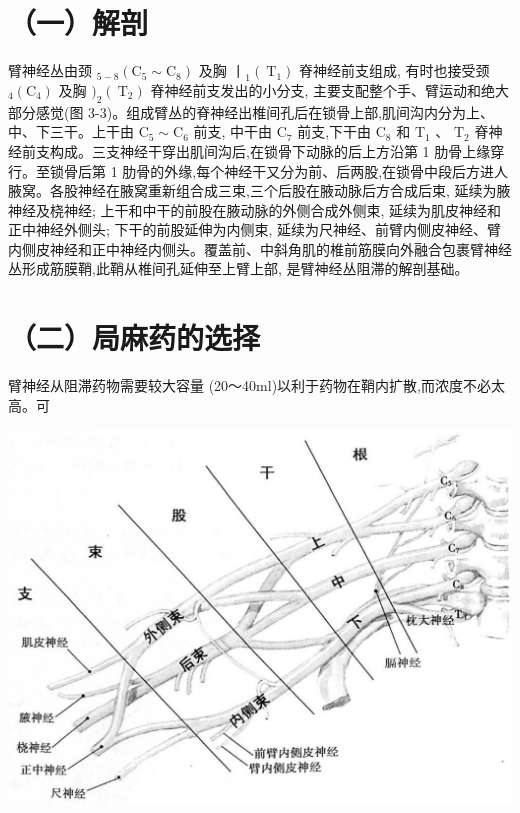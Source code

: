 \documentclass[10pt]{article}
\begin{document}
\section*{（一）解剖}
臂神经丛由颈 ${ }_{5-8}\left(\mathrm{C}_{5} \sim \mathrm{C}_{8}\right)$ 及胸 $丨_{1}\left(\mathrm{~T}_{1}\right)$ 脊神经前支组成, 有时也接受颈 ${ }_{4}\left(\mathrm{C}_{4}\right)$ 及胸 $)_{2}\left(\mathrm{~T}_{2}\right)$ 脊神经前支发出的小分支, 主要支配整个手、臂运动和绝大部分感觉(图 3-3)。组成臂丛的脊神经出椎间孔后在锁骨上部,肌间沟内分为上、中、下三干。上干由 $\mathrm{C}_{5} \sim \mathrm{C}_{6}$ 前支, 中干由 $\mathrm{C}_{7}$ 前支,下干由 $\mathrm{C}_{8}$ 和 $\mathrm{T}_{1}$ 、 $\mathrm{T}_{2}$ 脊神经前支构成。三支神经干穿出肌间沟后,在锁骨下动脉的后上方沿第 1 肋骨上缘穿行。至锁骨后第 1 肋骨的外缘,每个神经干又分为前、后两股,在锁骨中段后方进人腋窝。各股神经在腋窝重新组合成三束,三个后股在腋动脉后方合成后束, 延续为腋神经及桡神经; 上干和中干的前股在腋动脉的外侧合成外侧束, 延续为肌皮神经和正中神经外侧头; 下干的前股延伸为内侧束, 延续为尺神经、前臂内侧皮神经、臂内侧皮神经和正中神经内侧头。覆盖前、中斜角肌的椎前筋膜向外融合包裹臂神经丛形成筋膜鞘,此鞘从椎间孔延伸至上臂上部, 是臂神经丛阻滞的解剖基础。

\section*{（二）局麻药的选择}
臂神经从阻滞药物需要较大容量 (20～40ml)以利于药物在鞘内扩散,而浓度不必太高。可

\begin{center}
\includegraphics[max width=\textwidth]{2024_07_09_002a177993bd97d1d6d7g-053}
\end{center}
\end{document}
